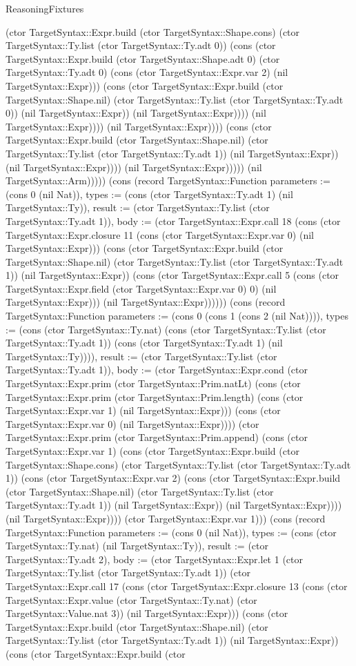 \begin{lexlean}{ReasoningFixtures}
\begin{semanticmodule}
{(ctor TargetSyntax::Expr.build (ctor TargetSyntax::Shape.cons) (ctor TargetSyntax::Ty.list (ctor TargetSyntax::Ty.adt 0)) (cons (ctor TargetSyntax::Expr.build (ctor TargetSyntax::Shape.adt 0) (ctor TargetSyntax::Ty.adt 0) (cons (ctor TargetSyntax::Expr.var 2) (nil TargetSyntax::Expr))) (cons (ctor TargetSyntax::Expr.build (ctor TargetSyntax::Shape.nil) (ctor TargetSyntax::Ty.list (ctor TargetSyntax::Ty.adt 0)) (nil TargetSyntax::Expr)) (nil TargetSyntax::Expr)))) (nil TargetSyntax::Expr)))) (nil TargetSyntax::Expr)))) (cons (ctor TargetSyntax::Expr.build (ctor TargetSyntax::Shape.nil) (ctor TargetSyntax::Ty.list (ctor TargetSyntax::Ty.adt 1)) (nil TargetSyntax::Expr)) (nil TargetSyntax::Expr)))) (nil TargetSyntax::Expr))))) (nil TargetSyntax::Arm))))}) (cons (record TargetSyntax::Function {parameters := (cons 0 (nil Nat)), types := (cons (ctor TargetSyntax::Ty.adt 1) (nil TargetSyntax::Ty)), result := (ctor TargetSyntax::Ty.list (ctor TargetSyntax::Ty.adt 1)), body := (ctor TargetSyntax::Expr.call 18 (cons (ctor TargetSyntax::Expr.closure 11 (cons (ctor TargetSyntax::Expr.var 0) (nil TargetSyntax::Expr))) (cons (ctor TargetSyntax::Expr.build (ctor TargetSyntax::Shape.nil) (ctor TargetSyntax::Ty.list (ctor TargetSyntax::Ty.adt 1)) (nil TargetSyntax::Expr)) (cons (ctor TargetSyntax::Expr.call 5 (cons (ctor TargetSyntax::Expr.field (ctor TargetSyntax::Expr.var 0) 0) (nil TargetSyntax::Expr))) (nil TargetSyntax::Expr)))))}) (cons (record TargetSyntax::Function {parameters := (cons 0 (cons 1 (cons 2 (nil Nat)))), types := (cons (ctor TargetSyntax::Ty.nat) (cons (ctor TargetSyntax::Ty.list (ctor TargetSyntax::Ty.adt 1)) (cons (ctor TargetSyntax::Ty.adt 1) (nil TargetSyntax::Ty)))), result := (ctor TargetSyntax::Ty.list (ctor TargetSyntax::Ty.adt 1)), body := (ctor TargetSyntax::Expr.cond (ctor TargetSyntax::Expr.prim (ctor TargetSyntax::Prim.natLt) (cons (ctor TargetSyntax::Expr.prim (ctor TargetSyntax::Prim.length) (cons (ctor TargetSyntax::Expr.var 1) (nil TargetSyntax::Expr))) (cons (ctor TargetSyntax::Expr.var 0) (nil TargetSyntax::Expr)))) (ctor TargetSyntax::Expr.prim (ctor TargetSyntax::Prim.append) (cons (ctor TargetSyntax::Expr.var 1) (cons (ctor TargetSyntax::Expr.build (ctor TargetSyntax::Shape.cons) (ctor TargetSyntax::Ty.list (ctor TargetSyntax::Ty.adt 1)) (cons (ctor TargetSyntax::Expr.var 2) (cons (ctor TargetSyntax::Expr.build (ctor TargetSyntax::Shape.nil) (ctor TargetSyntax::Ty.list (ctor TargetSyntax::Ty.adt 1)) (nil TargetSyntax::Expr)) (nil TargetSyntax::Expr)))) (nil TargetSyntax::Expr)))) (ctor TargetSyntax::Expr.var 1))}) (cons (record TargetSyntax::Function {parameters := (cons 0 (nil Nat)), types := (cons (ctor TargetSyntax::Ty.nat) (nil TargetSyntax::Ty)), result := (ctor TargetSyntax::Ty.adt 2), body := (ctor TargetSyntax::Expr.let 1 (ctor TargetSyntax::Ty.list (ctor TargetSyntax::Ty.adt 1)) (ctor TargetSyntax::Expr.call 17 (cons (ctor TargetSyntax::Expr.closure 13 (cons (ctor TargetSyntax::Expr.value (ctor TargetSyntax::Ty.nat) (ctor TargetSyntax::Value.nat 3)) (nil TargetSyntax::Expr))) (cons (ctor TargetSyntax::Expr.build (ctor TargetSyntax::Shape.nil) (ctor TargetSyntax::Ty.list (ctor TargetSyntax::Ty.adt 1)) (nil TargetSyntax::Expr)) (cons (ctor TargetSyntax::Expr.build (ctor }
\end{semanticmodule}
\end{lexlean}
